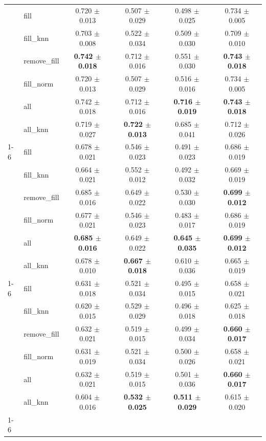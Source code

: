 \begin{table}[htbp]
\begin{tabular}{llcccc}
{{\cline{1-6}
\multirow[t]{7}{*}{30%
 & fill & 0.720 $\pm$ 0.013 & 0.507 $\pm$ 0.029 & 0.498 $\pm$ 0.025 & 0.734 $\pm$ 0.005 \\
 & fill_knn & 0.703 $\pm$ 0.008 & 0.522 $\pm$ 0.034 & 0.509 $\pm$ 0.030 & 0.709 $\pm$ 0.010 \\
 & remove_fill & \textbf{0.742 $\pm$ 0.018} & 0.712 $\pm$ 0.016 & 0.551 $\pm$ 0.030 & \textbf{0.743 $\pm$ 0.018} \\
 & fill_norm & 0.720 $\pm$ 0.013 & 0.507 $\pm$ 0.029 & 0.516 $\pm$ 0.016 & 0.734 $\pm$ 0.005 \\
 & all & 0.742 $\pm$ 0.018 & 0.712 $\pm$ 0.016 & \textbf{0.716 $\pm$ 0.019} & \textbf{0.743 $\pm$ 0.018} \\
 & all_knn & 0.719 $\pm$ 0.027 & \textbf{0.722 $\pm$ 0.013} & 0.685 $\pm$ 0.041 & 0.712 $\pm$ 0.026 \\
\cline{1-6}
\multirow[t]{7}{*}{40%
 & fill & 0.678 $\pm$ 0.021 & 0.546 $\pm$ 0.023 & 0.491 $\pm$ 0.023 & 0.686 $\pm$ 0.019 \\
 & fill_knn & 0.664 $\pm$ 0.021 & 0.552 $\pm$ 0.012 & 0.492 $\pm$ 0.032 & 0.669 $\pm$ 0.019 \\
 & remove_fill & 0.685 $\pm$ 0.016 & 0.649 $\pm$ 0.022 & 0.530 $\pm$ 0.030 & \textbf{0.699 $\pm$ 0.012} \\
 & fill_norm & 0.677 $\pm$ 0.021 & 0.546 $\pm$ 0.023 & 0.483 $\pm$ 0.017 & 0.686 $\pm$ 0.019 \\
 & all & \textbf{0.685 $\pm$ 0.016} & 0.649 $\pm$ 0.022 & \textbf{0.645 $\pm$ 0.035} & \textbf{0.699 $\pm$ 0.012} \\
 & all_knn & 0.678 $\pm$ 0.010 & \textbf{0.667 $\pm$ 0.018} & 0.610 $\pm$ 0.036 & 0.665 $\pm$ 0.019 \\
\cline{1-6}
\multirow[t]{7}{*}{50%
 & fill & 0.631 $\pm$ 0.018 & 0.521 $\pm$ 0.034 & 0.495 $\pm$ 0.015 & 0.658 $\pm$ 0.021 \\
 & fill_knn & 0.620 $\pm$ 0.015 & 0.529 $\pm$ 0.029 & 0.496 $\pm$ 0.018 & 0.625 $\pm$ 0.018 \\
 & remove_fill & 0.632 $\pm$ 0.021 & 0.519 $\pm$ 0.015 & 0.499 $\pm$ 0.034 & \textbf{0.660 $\pm$ 0.017} \\
 & fill_norm & 0.631 $\pm$ 0.019 & 0.521 $\pm$ 0.034 & 0.500 $\pm$ 0.026 & 0.658 $\pm$ 0.021 \\
 & all & 0.632 $\pm$ 0.021 & 0.519 $\pm$ 0.015 & 0.501 $\pm$ 0.036 & \textbf{0.660 $\pm$ 0.017} \\
 & all_knn & 0.604 $\pm$ 0.016 & \textbf{0.532 $\pm$ 0.025} & \textbf{0.511 $\pm$ 0.029} & 0.615 $\pm$ 0.020 \\
\cline{1-6}
\bottomrule
\end{tabular}
\end{table}
